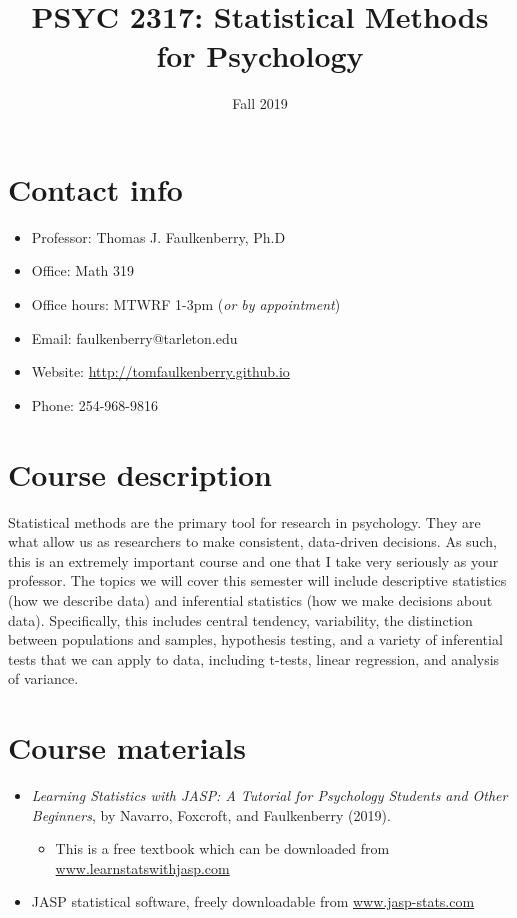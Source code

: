 \documentclass[10pt]{article}
\date{Fall 2019}
\title{PSYC 2317: Statistical Methods for Psychology}
\begin{document}
\maketitle

\section*{Contact info}
\label{sec:orgdd2c4db}
\begin{itemize}
\item Professor: Thomas J. Faulkenberry, Ph.D
\item Office: Math 319
\item Office hours: MTWRF 1-3pm (\emph{or by appointment})
\item Email: faulkenberry@tarleton.edu
\item Website: \url{http://tomfaulkenberry.github.io}
\item Phone: 254-968-9816
\end{itemize}

\section*{Course description}
\label{sec:orgebbabbe}

Statistical methods are the primary tool for research in psychology. They are what allow us as researchers to make consistent, data-driven decisions.  As such, this is an extremely important course and one that I take very seriously as your professor. The topics we will cover this semester will include descriptive statistics (how we describe data) and inferential statistics (how we make decisions about data).  Specifically, this includes central tendency, variability, the distinction between populations and samples, hypothesis testing, and a variety of inferential tests that we can apply to data, including t-tests, linear regression, and analysis of variance.

\section*{Course materials}
\label{sec:orga314af9}
\begin{itemize}
\item \emph{Learning Statistics with JASP: A Tutorial for Psychology Students and Other Beginners}, by Navarro, Foxcroft, and Faulkenberry (2019). 
\begin{itemize}
\item This is a free textbook which can be downloaded from \href{http://learnstatswithjasp.com}{www.learnstatswithjasp.com}
\end{itemize}
\item JASP statistical software, freely downloadable from \href{http://www.jasp-stats.com}{www.jasp-stats.com}
\end{itemize}
\end{document}
